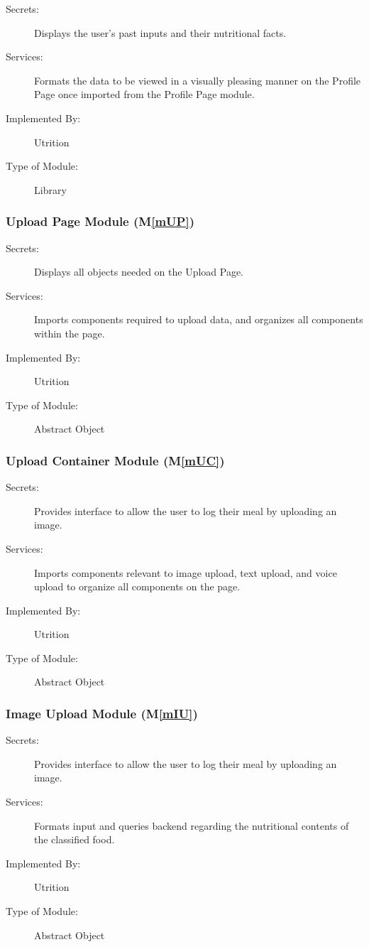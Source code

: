 \documentclass[12pt, titlepage]{article}
\newcommand{\mref}[1]{M\ref{#1}}
\begin{document}
\begin{description}
	\item[Secrets:]Displays the user's past inputs and their nutritional facts.
	\item[Services:]Formats the data to be viewed in a visually pleasing manner 
	on the Profile Page once imported from the Profile Page module.
	\item[Implemented By:] Utrition
	\item[Type of Module:] Library
	
\end{description}

\subsubsection{Upload Page Module (\mref{mUP})}

\begin{description}
\item[Secrets:]Displays all objects needed on the Upload Page.
\item[Services:] Imports components required to upload data, and organizes all 
components within the page. 
\item[Implemented By:] Utrition
\item[Type of Module:] Abstract Object
\end{description}

\subsubsection{Upload Container Module (\mref{mUC})}

\begin{description}
	\item[Secrets:]Provides interface to allow the user to log their meal by 
	uploading an image.
	\item[Services:]Imports components relevant to image upload, text upload, 
	and voice upload to organize all components on the page.
	\item[Implemented By:] Utrition
	\item[Type of Module:] Abstract Object
\end{description}

\subsubsection{Image Upload Module (\mref{mIU})}

\begin{description}
	\item[Secrets:]Provides interface to allow the user to log their meal by 
	uploading an image.
	\item[Services:]Formats input and queries backend regarding the nutritional 
	contents of the classified food.
	\item[Implemented By:] Utrition
	\item[Type of Module:] Abstract Object
\end{description}
\end{document}

